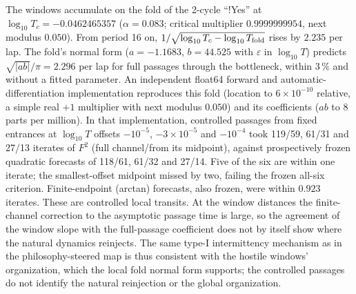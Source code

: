 \documentclass[11pt,letterpaper]{article}
\begin{document}
The windows accumulate on the fold of the 2-cycle ``!Yes'' at $\log_{10}T_c=-0.0462465357$ ($\alpha=0.083$; critical
multiplier $0.9999999954$, next modulus $0.050$). From period 16 on, $1/\sqrt{\log_{10}T_c-\log_{10}T_{\rm fold}}$
rises by $2.235$ per lap. The fold's normal form ($a=-1.1683$, $b=44.525$ with $\varepsilon$ in $\log_{10}T$) predicts
$\sqrt{|ab|}/\pi=2.296$ per lap for full passages through the bottleneck, within 3\,\% and without a fitted
parameter. An independent float64 forward and automatic-differentiation implementation reproduces this fold
(location to $6\times10^{-10}$ relative, a simple real $+1$ multiplier with next modulus $0.050$) and its coefficients
($ab$ to 8 parts per million). In that implementation, controlled passages from fixed entrances at $\log_{10}T$
offsets $-10^{-5}$, $-3\times10^{-5}$ and $-10^{-4}$ took 119/59, 61/31 and 27/13 iterates of $F^2$ (full
channel/from its midpoint), against prospectively frozen quadratic forecasts of 118/61, 61/32 and 27/14. Five of the
six are within one iterate; the smallest-offset midpoint missed by two, failing the frozen all-six criterion.
Finite-endpoint (arctan) forecasts, also frozen, were within $0.923$ iterates. These are controlled local transits. At
the window distances the finite-channel correction to the asymptotic passage time is large, so the agreement of the
window slope with the full-passage coefficient does not by itself show where the natural dynamics reinjects. The same
type-I intermittency mechanism as in the philosophy-steered map is thus consistent with the hostile windows'
organization, which the local fold normal form supports; the controlled passages do not identify the natural
reinjection or the global organization.
\end{document}
